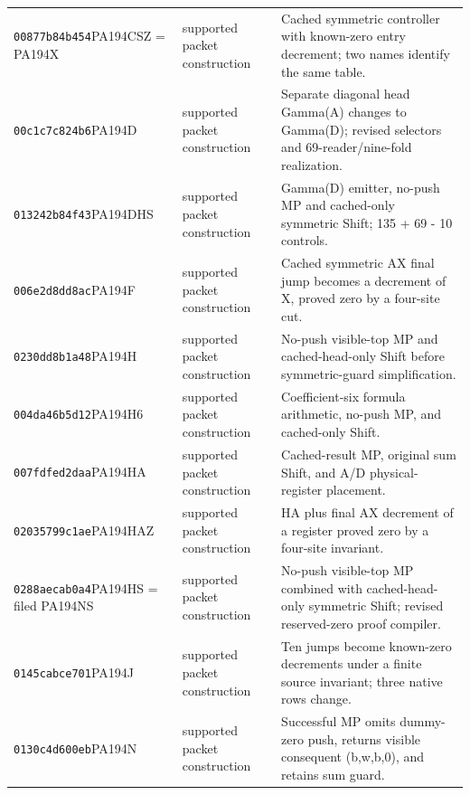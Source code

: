 {\begin{longtable}{@{}>{\raggedright\arraybackslash}p{}>{\raggedright\arraybackslash}p{}>{\raggedright\arraybackslash}p{}@{}}
\texttt{00877b84b454}\newline PA194CSZ = PA194X & supported packet construction & Cached symmetric controller with known-zero entry decrement; two names identify the same table.\\
\texttt{00c1c7c824b6}\newline PA194D & supported packet construction & Separate diagonal head Gamma(A) changes to Gamma(D); revised selectors and 69-reader/nine-fold realization.\\
\texttt{013242b84f43}\newline PA194DHS & supported packet construction & Gamma(D) emitter, no-push MP and cached-only symmetric Shift; 135 + 69 - 10 controls.\\
\texttt{006e2d8dd8ac}\newline PA194F & supported packet construction & Cached symmetric AX final jump becomes a decrement of X, proved zero by a four-site cut.\\
\texttt{0230dd8b1a48}\newline PA194H & supported packet construction & No-push visible-top MP and cached-head-only Shift before symmetric-guard simplification.\\
\texttt{004da46b5d12}\newline PA194H6 & supported packet construction & Coefficient-six formula arithmetic, no-push MP, and cached-only Shift.\\
\texttt{007fdfed2daa}\newline PA194HA & supported packet construction & Cached-result MP, original sum Shift, and A/D physical-register placement.\\
\texttt{02035799c1ae}\newline PA194HAZ & supported packet construction & HA plus final AX decrement of a register proved zero by a four-site invariant.\\
\texttt{0288aecab0a4}\newline PA194HS = filed PA194NS & supported packet construction & No-push visible-top MP combined with cached-head-only symmetric Shift; revised reserved-zero proof compiler.\\
\texttt{0145cabce701}\newline PA194J & supported packet construction & Ten jumps become known-zero decrements under a finite source invariant; three native rows change.\\
\texttt{0130c4d600eb}\newline PA194N & supported packet construction & Successful MP omits dummy-zero push, returns visible consequent (b,w,b,0), and retains sum guard.\\

\end{longtable}}
